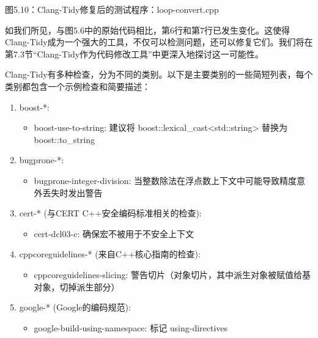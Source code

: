 \begin{center}
图5.10：Clang-Tidy修复后的测试程序：loop-convert.cpp
\end{center}

如我们所见，与图5.6中的原始代码相比，第6行和第7行已发生变化。这使得Clang-Tidy成为一个强大的工具，不仅可以检测问题，还可以修复它们。我们将在第7.3节“Clang-Tidy作为代码修改工具”中更深入地探讨这一可能性。


Clang-Tidy有多种检查，分为不同的类别。以下是主要类别的一些简短列表，每个类别都包含一个示例检查和简要描述：


\begin{enumerate}
\item
boost-*:

\begin{itemize}
\item
boost-use-to-string: 建议将 boost::lexical\_cast<std::string> 替换为 boost::to\_string
\end{itemize}

\item
bugprone-*:

\begin{itemize}
\item
bugprone-integer-division: 当整数除法在浮点数上下文中可能导致精度意外丢失时发出警告
\end{itemize}

\item
cert-* (与CERT C++安全编码标准相关的检查):

\begin{itemize}
\item
cert-dcl03-c: 确保宏不被用于不安全上下文
\end{itemize}

\item
cppcoreguidelines-* (来自C++核心指南的检查):

\begin{itemize}
\item
cppcoreguidelines-slicing: 警告切片（对象切片，其中派生对象被赋值给基对象，切掉派生部分）
\end{itemize}

\item
google-* (Google的编码规范):

\begin{itemize}
\item
google-build-using-namespace: 标记 using-directives
\end{itemize}


\end{enumerate}
